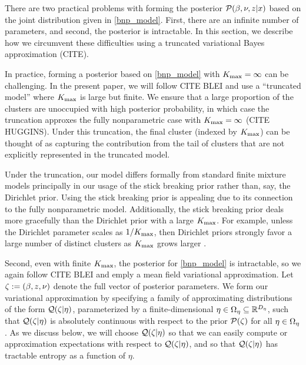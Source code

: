 There are two practical problems with forming the posterior
$\mathcal{P}(\beta, \nu, z \vert x)$ based on the joint distribution given in
\eqref{bnp_model}.  First, there are an infinite number of parameters,
and second, the posterior is intractable.  In this section, we describe
how we circumvent these difficulties using a truncated variational Bayes
approximation (CITE).

In practice, forming a posterior based on \eqref{bnp_model} with ${K_{\mathrm{max}}} =
\infty$ can be challenging.  In the present paper, we will follow CITE BLEI and
use a ``truncated model'' where ${K_{\mathrm{max}}}$ is large but finite. We ensure that a
large proportion of the clusters are unoccupied with high posterior probability,
in which case the truncation approxes the fully nonparametric case with ${K_{\mathrm{max}}} =
\infty$ (CITE HUGGINS).  Under this truncation, the final cluster (indexed by
${K_{\mathrm{max}}}$) can be thought of as capturing the contribution from the tail of
clusters that are not explicitly represented in the truncated model.

Under the truncation, our model differs formally from standard finite mixture
models principally in our usage of the stick breaking prior rather than, say,
the Dirichlet prior.  Using the stick breaking prior is appealing due to its
connection to the fully nonparametric model.  Additionally, the stick breaking
prior deals more gracefully than the Dirichlet prior with a large ${K_{\mathrm{max}}}$.  For
example, unless the Dirichlet parameter scales as $1 / {K_{\mathrm{max}}}$, then Dirichlet
priors strongly favor a large number of  distinct clusters as ${K_{\mathrm{max}}}$ grows
larger \citep[Problem 3]{stanford:2014:bnphw}.

Second, even with finite ${K_{\mathrm{max}}}$, the posterior for \eqref{bnp_model} is
intractable, so we again follow CITE BLEI and emply a mean field variational
approximation.  Let $\zeta := (\beta, z, \nu)$ denote the full vector of
posterior parameters.  We form our variational approximation by specifying a
family of approximating distributions of the form $\mathcal{Q}(\zeta \vert \eta)$,
parameterized by a finite-dimensional $\eta \in \Omega_{\eta} \subseteq
\mathbb{R}^{{D_{\eta}}}$, such that $\mathcal{Q}(\zeta \vert \eta)$ is absolutely continuous
with respect to the prior $\mathcal{P}(\zeta)$ for all $\eta \in \Omega_{\eta}$.  As we discuss
below, we will choose $\mathcal{Q}(\zeta \vert \eta)$ so that we can easily compute or
approximation expectations with respect to $\mathcal{Q}(\zeta \vert \eta)$, and so that
$\mathcal{Q}(\zeta \vert \eta)$ has tractable entropy as a function of $\eta$.


